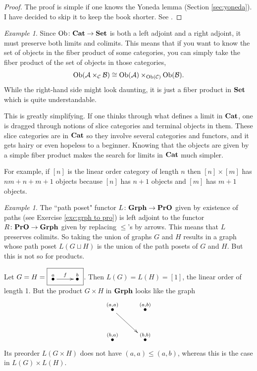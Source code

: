 \documentclass{book}
\def\tn{\textnormal}
\def\mc{\mathcal}
\def\Ob{\tn{Ob}}
\def\to{\rightarrow}
\def\taking{\colon}
\def\iso{\cong}
\newcommand{\LMO}[1]{\stackrel{#1}{\bullet}}
\def\Cat{{\bf Cat}}
\def\Grph{{\bf Grph}}
\def\Set{{\bf Set}}
\def\PrO{{\bf PrO}}
\def\mcA{\mc{A}}
\def\mcB{\mc{B}}
\def\mcC{\mc{C}}
\theoremstyle{remark}
\newtheorem{example}[subsubsection]{Example}
\theoremstyle{definition}
\begin{document}
\begin{proof}

The proof is simple if one knows the Yoneda lemma (Section \ref{sec:yoneda}). I have decided to skip it to keep the book shorter. See \cite{Mac}.

\end{proof}

\begin{example}

Since $\Ob\taking\Cat\to\Set$ is both a left adjoint and a right adjoint, it must preserve both limits and colimits. This means that if you want to know the set of objects in the fiber product of some categories, you can simply take the fiber product of the set of objects in those categories, $$\Ob(\mcA\times_\mcC\mcB)\iso\Ob(\mcA)\times_{\Ob(\mcC)}\Ob(\mcB).$$ While the right-hand side might look daunting, it is just a fiber product in $\Set$ which is quite understandable.

This is greatly simplifying. If one thinks through what defines a limit in $\Cat$, one is dragged through notions of slice categories and terminal objects in them. These slice categories are in $\Cat$ so they involve several categories and functors, and it gets hairy or even hopeless to a beginner. Knowing that the objects are given by a simple fiber product makes the search for limits in $\Cat$ much simpler. 

For example, if $[n]$ is the linear order category of length $n$ then $[n]\times[m]$ has $nm+n+m+1$ objects because $[n]$ has $n+1$ objects and $[m]$ has $m+1$ objects. 

\end{example}

\begin{example}

The ``path poset" functor $L\taking\Grph\to\PrO$ given by existence of paths (see Exercise \ref{exc:grph to pro}) is left adjoint to the functor $R\taking\PrO\to\Grph$ given by replacing $\leq$'s by arrows. This means that $L$ preserves colimits. So taking the union of graphs $G$ and $H$ results in a graph whose path poset  $L(G\sqcup H)$ is the union of the path posets of $G$ and $H$. But this is not so for products. 

Let $G=H=\fbox{\xymatrix{\LMO{a}\ar[r]^f&\LMO{b}}}$. Then $L(G)=L(H)=[1]$, the linear order of length 1. But the product $G\times H$ in $\Grph$ looks like the graph 
$$\xymatrix{\LMO{(a,a)}\ar[rd]&\LMO{(a,b)}\\\LMO{(b,a)}&\LMO{(b,b)}}$$
Its preorder $L(G\times H)$ does not have $(a,a)\leq(a,b)$, whereas this is the case in $L(G)\times L(H)$.

\end{example}
\end{document}
